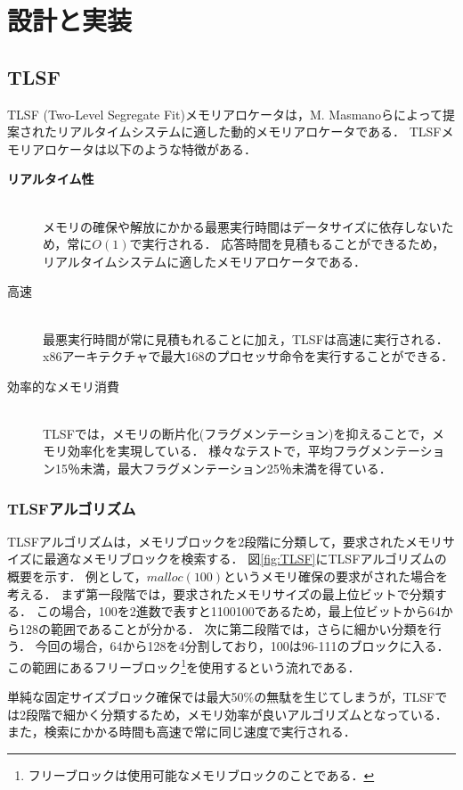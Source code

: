 \documentclass[submit,techrep]{ipsj_v2/UTF8/ipsj}
\begin{document}
\section{設計と実装}
\label{sec:DesignImplementation}


\subsection{TLSF}
\label{sec:TLSF}
TLSF (Two-Level Segregate Fit)メモリアロケータは，M. Masmanoらによって提案されたリアルタイムシステムに適した動的メモリアロケータである．
TLSFメモリアロケータは以下のような特徴がある．
\begin{description}
    \item[{\bf リアルタイム性}]\mbox{}\\
        メモリの確保や解放にかかる最悪実行時間はデータサイズに依存しないため，常に$O(1)$で実行される．
        応答時間を見積もることができるため，リアルタイムシステムに適したメモリアロケータである．
    \item[{高速}]\mbox{}\\
        最悪実行時間が常に見積もれることに加え，TLSFは高速に実行される．
        x86アーキテクチャで最大168のプロセッサ命令を実行することができる．
    \item[{効率的なメモリ消費}]\mbox{}\\
        TLSFでは，メモリの断片化(フラグメンテーション)を抑えることで，メモリ効率化を実現している．
        様々なテストで，平均フラグメンテーション15％未満，最大フラグメンテーション25％未満を得ている．
\end{description}


\subsubsection{TLSFアルゴリズム}

TLSFアルゴリズムは，メモリブロックを2段階に分類して，要求されたメモリサイズに最適なメモリブロックを検索する．
図\ref{fig:TLSF}にTLSFアルゴリズムの概要を示す．
例として，$malloc(100)$というメモリ確保の要求がされた場合を考える．
まず第一段階では，要求されたメモリサイズの最上位ビットで分類する．
この場合，100を2進数で表すと1100100であるため，最上位ビットから64から128の範囲であることが分かる．
次に第二段階では，さらに細かい分類を行う．
今回の場合，64から128を4分割しており，100は96-111のブロックに入る．
この範囲にあるフリーブロック\footnote{フリーブロックは使用可能なメモリブロックのことである．}を使用するという流れである．

単純な固定サイズブロック確保では最大50\%の無駄を生じてしまうが，TLSFでは2段階で細かく分類するため，メモリ効率が良いアルゴリズムとなっている．
また，検索にかかる時間も高速で常に同じ速度で実行される．
\end{document}
